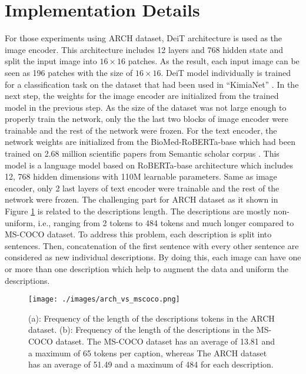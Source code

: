 \documentclass{midl}
\begin{document}
\section{Implementation Details}\label{appc}
For those experiments using ARCH dataset, DeiT architecture \cite{touvron2021training} is used as the image encoder. This architecture includes 12 layers and 768 hidden state and split the input image into $16 \times 16$ patches. As the result, each input image can be seen as 196 patches with the size of $16 \times 16$. DeiT model individually is trained for a classification task on the dataset that had been used in ``KimiaNet'' \cite{riasatian2021fine}. In the next step, the weights for the image encoder are initialized from the trained model in the previous step. As the size of the dataset was not large enough to properly train the network, only the the last two blocks of image encoder were trainable and the rest of the network were frozen.  For the text encoder, the network weights are initialized from the BioMed-RoBERTa-base \cite{domains} which had been trained on 2.68 million scientific papers from Semantic scholar corpus \cite{Semantic31:online}. 
This model is a language model based on RoBERTa-base architecture \cite{liu2019roberta} which includes 12, 768 hidden dimensions with 110M learnable parameters. Same as image encoder, only 2 last layers of text encoder were trainable and the rest of the network were frozen. The challenging part for ARCH dataset as it shown in Figure \ref{token_length} is related to the descriptions length. The descriptions are mostly non-uniform, i.e., ranging from 2 tokens to 484 tokens and much longer compared to MS-COCO dataset. To address this problem, each description is split into sentences. Then, concatenation of the first sentence with every other sentence are considered as new individual descriptions. By doing this, each image can have one or more than one description which help to augment the data and uniform the descriptions. 
 
\begin{figure}[t!]
    \centering
    \texttt{[image: ./images/arch\_vs\_mscoco.png]}
    \caption{(a): Frequency of the length of the descriptions tokens in the ARCH dataset. (b): Frequency of the length of the descriptions in the MS-COCO dataset. The MS-COCO dataset has an average of 13.81 and a maximum of 65 tokens per caption, whereas The ARCH dataset has an average of 51.49 and a maximum of 484 for each description.}
    \label{token_length}
\end{figure}
\end{document}
